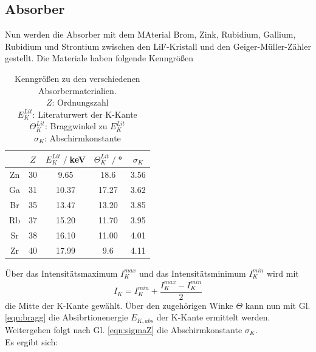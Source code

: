 \subsection{Absorber}
Nun werden die Absorber mit dem MAterial Brom, Zink, Rubidium, Gallium, Rubidium und Strontium
zwischen den LiF-Kristall und den Geiger-Müller-Zähler gestellt.
Die Materiale haben folgende Kenngrößen
\begin{table}
    \centering
    \begin{tabular}{c | c c c c}
        \toprule
        &$Z$ & $E_K^{Lit}\;/\;$keV & $\Theta_K^{Lit}\;/\;$° & $\sigma_K$\\
        \midrule
        Zn & 30 & 9.65 & 18.6 & 3.56\\
        Ga & 31 & 10.37 & 17.27 &3.62\\
        Br & 35 & 13.47 & 13.20 &3.85\\
        Rb & 37 & 15.20 & 11.70 &3.95\\
        Sr & 38 & 16.10 & 11.00 &4.01\\
        Zr & 40 & 17.99 & 9.6 & 4.11\\
        \bottomrule
    \end{tabular}
    \caption{Kenngrößen zu den verschiedenen Absorbermaterialien.\cite{ref}\\
    $Z$: Ordnungszahl\\
    $E_K^{Lit}$: Literaturwert der K-Kante\\
    $\Theta_K^{Lit}$: Braggwinkel zu $E_K^{Lit}$\\
    $\sigma_K$: Abschirmkonstante}
    \label{tab:kenngroesse}
\end{table}
Über das Intensitätsmaximum $I_K^{max}$ und das Intensitätsminimum $I_K^{min}$
wird mit
\begin{equation}
    I_K=I_K^{min}+\frac{I_K^{max}-I_K^{min}}{2}
    \label{eqn:intensität}
\end{equation}
die Mitte der K-Kante gewählt. Über den zugehörigen Winke $\Theta$ kann nun mit
Gl. \ref{eqn:bragg} die Absibrtionenergie $E_{K,abs}$ der K-Kante ermittelt werden.
Weitergehen folgt nach Gl. \ref{eqn:sigmaZ} die Abschirmkonstante $\sigma_K$.\\
Es ergibt sich:
